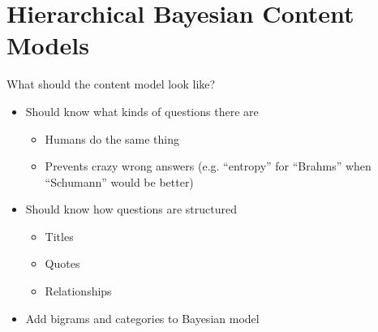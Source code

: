 
\iflong
\section{Hierarchical Bayesian Content Models}
\fi

\begin{frame}{What should the content model look like?}
	\begin{itemize}
		\item Should know what kinds of questions there are
                  \begin{itemize}
                    \item Humans do the same thing
                      \item Prevents crazy wrong answers (e.g. ``entropy'' for
                        ``Brahms'' when ``Schumann'' would be better)
                    \end{itemize}
		\item Should know how questions are structured
		\begin{itemize}
			\item Titles
			\item Quotes
                          \item Relationships
		\end{itemize}
                \pause
                 \item Add bigrams and categories to Bayesian model~\cite{wood-09}
	\end{itemize}

\iflong
\else
\pause

\fi

\end{frame}

\iflong

